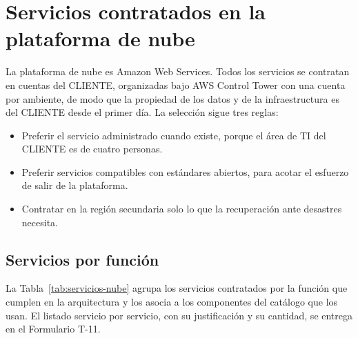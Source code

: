 %

\section{Servicios contratados en la plataforma de nube}
\label{sec:servicios-nube}

La plataforma de nube es Amazon Web Services. Todos los servicios se contratan en cuentas del CLIENTE, organizadas bajo AWS Control Tower con una cuenta por ambiente, de modo que la propiedad de los datos y de la infraestructura es del CLIENTE desde el primer día. La selección sigue tres reglas:

\begin{itemize}
  \item Preferir el servicio administrado cuando existe, porque el área de TI del CLIENTE es de cuatro personas.
  \item Preferir servicios compatibles con estándares abiertos, para acotar el esfuerzo de salir de la plataforma.
  \item Contratar en la región secundaria solo lo que la recuperación ante desastres necesita.
\end{itemize}

\subsection{Servicios por función}

La Tabla~\ref{tab:servicios-nube} agrupa los servicios contratados por la función que cumplen en la arquitectura y los asocia a los componentes del catálogo que los usan. El listado servicio por servicio, con su justificación y su cantidad, se entrega en el Formulario T-11.

